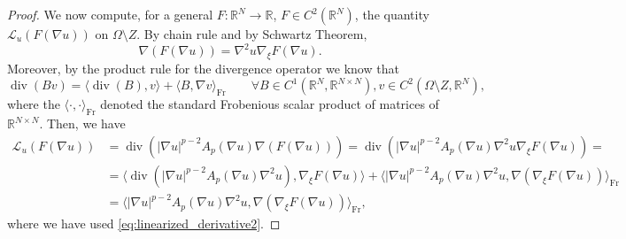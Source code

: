 \documentclass[10pt,a4paper, reqno]{amsart}
\numberwithin{equation}{section}
\newcommand{\R}{\mathbb{R}}
\renewcommand{\div}{\operatorname{div}}
\begin{document}
\begin{proof}
    We now compute, for a general $F: \R^N \to \R$, $F\in C^2(\R^N)$, the quantity $\mathcal{L}_u(F(\nabla u))$ on $\Omega \setminus Z$. By chain rule and by Schwartz Theorem, 
    \[
    \nabla (F(\nabla u)) = \nabla^2 u \nabla_\xi F (\nabla u).
    \]
    Moreover, by the product rule for the divergence operator we know that
    \begin{equation*}
        \div(Bv) = \langle \div(B) , v \rangle + \langle B , \nabla v \rangle_{\mathrm{Fr}} \qquad \forall B \in C^1(\R^N, \R^{N\times N}), v \in C^2(\Omega\setminus Z, \R^N),
    \end{equation*}
    where the $\langle \cdot , \cdot \rangle_{\mathrm{Fr}}$ denoted the standard Frobenious scalar product of matrices of $\R^{N\times N}$. Then, we have 
    \begin{equation*}
    \begin{split}
        \mathcal{L}_u(F(\nabla u)) &= 
        \div \left( |\nabla u|^{p-2} A_p(\nabla u)  \nabla (F(\nabla u)) \right)
        =
        \div \left( |\nabla u|^{p-2} A_p(\nabla u) \nabla^2 u \nabla_\xi F (\nabla u) \right)
        =
        \\
        &=\langle \div(|\nabla u|^{p-2} A_p(\nabla u) \nabla^2 u ) , \nabla_\xi F (\nabla u) \rangle + \langle |\nabla u|^{p-2} A_p(\nabla u) \nabla^2 u, \nabla (\nabla_\xi F (\nabla u) ) \rangle_{\mathrm{Fr}}
        \\
        &= \langle |\nabla u|^{p-2} A_p(\nabla u) \nabla^2 u, \nabla (\nabla_\xi F (\nabla u) ) \rangle_{\mathrm{Fr}},
    \end{split}
    \end{equation*}
    where we have used \eqref{eq:linearized_derivative2}. 
    

\end{proof}
\end{document}
